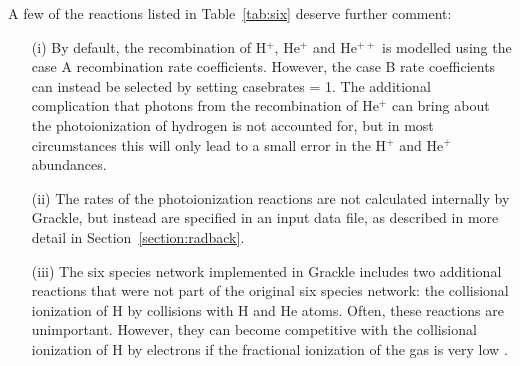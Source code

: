 A few of the reactions listed in Table~\ref{tab:six} deserve further comment:
\begin{enumerate}
\item[(i)] By default, the recombination of
H$^{+}$, He$^{+}$ and He$^{++}$ is modelled using the case A recombination rate coefficients. However, the case B
rate coefficients can instead be selected by setting casebrates = 1. The additional complication that photons from the recombination of
He$^{+}$ can bring about the photoionization of hydrogen \citep[discussed in some detail in][]{1989agna.book.....O} is not accounted
for, but in most circumstances this will only lead to a small error in the H$^{+}$ and He$^{+}$ abundances. 
\item[(ii)] The rates of the photoionization reactions are not calculated internally by Grackle, but instead are specified in an input data file,
as described in more detail in Section~\ref{section:radback}.
\item[(iii)] The six species network implemented in Grackle includes two additional reactions that were not part of the original \citet{1997NewA....2..181A}
six species network: the collisional ionization of H by collisions with H and He atoms. Often, these reactions are unimportant. However, they 
can become competitive with the collisional ionization of H by electrons if the fractional ionization of the gas is very low \citep[see e.g.][for an example of when this can be important]{2015MNRAS.451.2082G}.
\end{enumerate}

